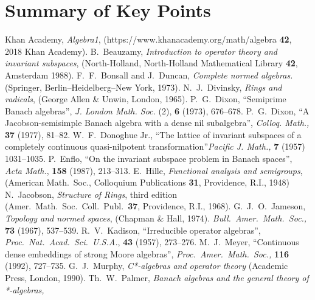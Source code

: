 \documentclass[11pt]{article}
\begin{document}
\section{Summary of Key Points}\label{S6}


\begin{thebibliography}{99}
 Khan Academy, {\em Algebra1}, (https://www.khanacademy.org/math/algebra {\bf
42}, 2018 Khan Academy).
 B.~Beauzamy, {\em Introduction to operator theory and
invariant subspaces}, (North-Holland, North-Holland Mathematical Library {\bf
42}, Amsterdam 1988).
 F.~F.~Bonsall and J.~Duncan, {\em Complete normed algebras.}
(Springer, Berlin--Heidelberg--New York, 1973).
 N.~J.~Divinsky, {\em Rings and radicals}, (George Allen
\& Unwin, London, 1965).
  P.~G.~Dixon, ``Semiprime Banach algebras'', {\em J. London Math. Soc.} (2),
{\bf 6} (1973), 676--678.
 P.~G.~Dixon, ``A Jacobson-semisimple Banach algebra with a dense nil
subalgebra'', {\em Colloq. Math.,} {\bf 37} (1977), 81--82.
 W.~F.~Donoghue Jr., ``The lattice of invariant subspaces of
a completely continuous quasi-nilpotent transformation''{\em Pacific J. Math.,} {\bf 7} (1957)
1031--1035.  %
 P.~Enflo, ``On the invariant subspace problem in Banach spaces'',
{\em Acta Math.}, {\bf 158} (1987), 213--313. %
 E.~Hille, {\em Functional analysis and semigroups},
(American Math.\ Soc., Colloquium Publications {\bf 31}, Providence, R.I., 1948)
 N.~Jacobson, {\em Structure of Rings}, third edition
(Amer.\ Math.\ Soc.\ Coll.\ Publ.\ {\bf 37}, Providence, R.I., 1968).
 G.~J.~O.~Jameson, {\em Topology and normed spaces},
(Chapman \& Hall, 1974).
{\em Bull.\ Amer.\ Math.\ Soc.,} {\bf 73} (1967), 537--539. %
 R.~V.~Kadison, ``Irreducible operator algebras'',
{\em Proc.\ Nat.\ Acad.\ Sci.\ U.S.A.}, {\bf 43} (1957), 273--276.
 M.~J.~Meyer, ``Continuous dense embeddings of strong Moore
algebras'', {\em Proc.\ Amer.\ Math.\ Soc.,} {\bf 116} (1992), 727--735.
 G.~J.~Murphy, {\em C*-algebras and operator theory}
(Academic Press, London, 1990).
 Th.~W.~Palmer, {\em Banach algebras and the general theory of *-algebras,
}
\end{thebibliography}
\end{document}
